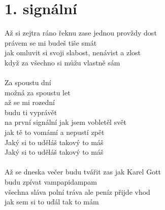 \section{1. signální}
Až si zejtra ráno řeknu zase jednou provždy dost\\
právem se mi budeš tiše smát\\
jak omluvit si svoji slabost, nenávist a zlost\\
když za všechno si můžu vlastně sám\\
\\
Za spoustu dní \\
možná za spoustu let\\
až se mi rozední \\
budu ti vyprávět\\
na první signální
jak jsem vobletěl svět\\
jak tě to vomámí a nepustí zpět\\
Jaký si to uděláš takový to máš\\
Jaký si to uděláš takový to máš\\
\\
Až se dneska večer budu tvářit zas jak Karel Gott\\
budu zpívat vampapidampam\\
všechna sláva polní tráva ale peníz přijde vhod\\
jak sem si to uďál tak to mám\\
\\
